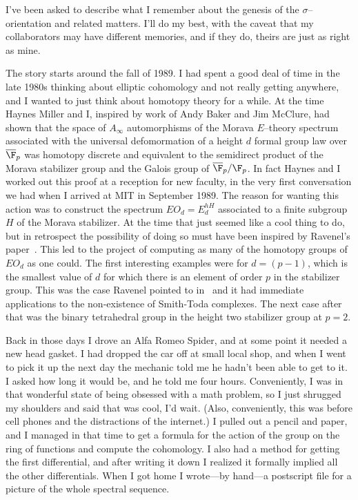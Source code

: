
I've been asked to describe what I remember about the genesis of the
$\sigma$--orientation and related matters.  I'll do my best, with the
caveat that my collaborators may have different memories, and if they do,
theirs are just as right as mine.

The story starts around the fall of 1989.  I had spent a good deal of
time in the late 1980s thinking about elliptic cohomology and not
really getting anywhere, and I wanted to just think about homotopy
theory for a while.  At the time Haynes Miller and I, inspired by work
of Andy Baker and Jim McClure, had shown that the space of
$A_{\infty}$ automorphisms of the Morava $E$--theory spectrum
associated with the universal defomormation of a height $d$ formal
group law over $\overline{\F}_{p}$ was homotopy discrete and equivalent to
the semidirect product of the Morava stabilizer group and the Galois
group of $\overline{\F}_{p}/\F_{p}$.  In fact Haynes and I worked out this
proof at a reception for new faculty, in the very first conversation
we had when I arrived at MIT in September 1989.  The reason for
wanting this action was to construct the spectrum $EO_{d}=E_{d}^{hH}$
associated to a finite subgroup $H$ of the Morava stabilizer.  At the
time that just seemed like a cool thing to do, but in retrospect the
possibility of doing so must have been inspired by Ravenel's
paper~\cite{RavenelNonexistenceArfInvariantElts}.  This led to the project of computing as many of
the homotopy groups of $EO_{d}$ as one could.  The first interesting
examples were for $d=(p-1)$, which is the smallest value of $d$ for
which there is an element of order $p$ in the stabilizer group.  This
was the case Ravenel pointed to in~\cite{RavenelNonexistenceArfInvariantElts} and it had immediate
applications to the non-existence of Smith-Toda complexes.  The next
case after that was the binary tetrahedral group in the height two
stabilizer group at $p=2$.

Back in those days I drove an Alfa Romeo Spider, and at some point it
needed a new head gasket.  I had dropped the car off at small local
shop, and when I went to pick it up the next day the mechanic told me
he hadn't been able to get to it.  I asked how long it would be, and he
told me four hours.  Conveniently, I was in that wonderful state of being
obsessed with a math problem, so I just shrugged my shoulders and said
that was cool, I'd wait.  (Also, conveniently, this was before cell
phones and the distractions of the internet.)  I pulled out a pencil
and paper, and I managed in that time to get a formula for the action of
the group on the ring of functions and compute the cohomology.  I also
had a method for getting the first differential, and after writing it
down I realized it formally implied all the other differentials.  When
I got home I wrote---by hand---a postscript file for a picture of the
whole spectral sequence.

